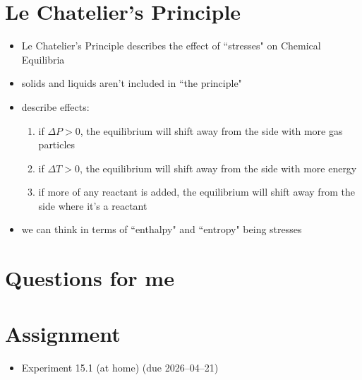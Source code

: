 \documentclass[10pt, oneside]{article}   	%
\begin{document}
\section*{Le Chatelier's Principle}
\begin{itemize}
\item Le Chatelier's Principle describes the effect of ``stresses" on Chemical Equilibria
\item solids and liquids aren't included in ``the principle"
\item describe effects:
\begin{enumerate}
\item if $\Delta P > 0$, the equilibrium will shift away from the side with more gas particles
\item if $\Delta T > 0$, the equilibrium will shift away from the side with more energy
\item if more of any reactant is added, the equilibrium will shift away from the side where it's a reactant
\end{enumerate}
\item we can think in terms of ``enthalpy" and ``entropy" being stresses
\end{itemize}

\section*{Questions for me}

\section*{Assignment}
\begin{itemize}
\item Experiment 15.1 (at home) (due 2026--04--21)
\end{itemize}
\end{document}
